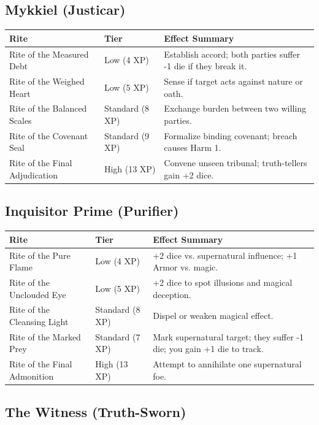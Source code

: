 \subsection{Mykkiel (Justicar)}

\begin{longtable}{p{} p{} p{}}
\hline
\textbf{Rite} & \textbf{Tier} & \textbf{Effect Summary} \\
\hline
Rite of the Measured Debt & Low (4 XP) & Establish accord; both parties suffer -1 die if they break it. \\
Rite of the Weighed Heart & Low (5 XP) & Sense if target acts against nature or oath. \\
Rite of the Balanced Scales & Standard (8 XP) & Exchange burden between two willing parties. \\
Rite of the Covenant Seal & Standard (9 XP) & Formalize binding covenant; breach causes Harm 1. \\
Rite of the Final Adjudication & High (13 XP) & Convene unseen tribunal; truth-tellers gain +2 dice. \\
\hline
\end{longtable}

\subsection{Inquisitor Prime (Purifier)}

\begin{longtable}{p{} p{} p{}}
\hline
\textbf{Rite} & \textbf{Tier} & \textbf{Effect Summary} \\
\hline
Rite of the Pure Flame & Low (4 XP) & +2 dice vs. supernatural influence; +1 Armor vs. magic. \\
Rite of the Unclouded Eye & Low (5 XP) & +2 dice to spot illusions and magical deception. \\
Rite of the Cleansing Light & Standard (8 XP) & Dispel or weaken magical effect. \\
Rite of the Marked Prey & Standard (7 XP) & Mark supernatural target; they suffer -1 die; you gain +1 die to track. \\
Rite of the Final Admonition & High (13 XP) & Attempt to annihilate one supernatural foe. \\
\hline
\end{longtable}

\subsection{The Witness (Truth-Sworn)}

